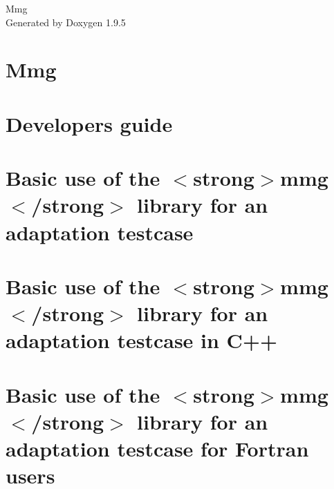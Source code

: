 \documentclass[twoside]{book}
\newcommand{\+}{\discretionary{\mbox{\scriptsize$\hookleftarrow$}}{}{}}
\newcommand{\clearemptydoublepage}{%
    \newpage{\pagestyle{empty}\cleardoublepage}%
  }
\begin{document}
  \raggedbottom
    \hypersetup{pageanchor=false,
                bookmarksnumbered=true,
                pdfencoding=unicode
               }
  \begin{titlepage}
  \vspace*{7cm}
  \begin{center}%
  {\Large Mmg}\\
  \vspace*{1cm}
  {\large Generated by Doxygen 1.9.5}\\
  \end{center}
  \end{titlepage}
  \clearemptydoublepage
  \tableofcontents
  \clearemptydoublepage
  \hypersetup{pageanchor=true}
\chapter{Mmg}
\label{index}\hypertarget{index}{}
\chapter{Developers guide}
\label{md_CONTRIBUTING}

\chapter{Basic use of the \texorpdfstring{$<$}{<}strong\texorpdfstring{$>$}{>}mmg\texorpdfstring{$<$}{<}/strong\texorpdfstring{$>$}{>} library for an adaptation testcase}
\label{md_libexamples_mmg_adaptation_example0_README}

\chapter{Basic use of the \texorpdfstring{$<$}{<}strong\texorpdfstring{$>$}{>}mmg\texorpdfstring{$<$}{<}/strong\texorpdfstring{$>$}{>} library for an adaptation testcase in C++}
\label{md_libexamples_mmg_adaptation_example0_cpp_README}

\chapter{Basic use of the \texorpdfstring{$<$}{<}strong\texorpdfstring{$>$}{>}mmg\texorpdfstring{$<$}{<}/strong\texorpdfstring{$>$}{>} library for an adaptation testcase for Fortran users}
\label{md_libexamples_mmg_adaptation_example0_fortran_README}

\end{document}
